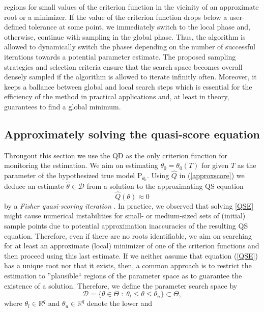 \documentclass[article, nojss]{jss}
\numberwithin{equation}{section}			%
\newcommand{\D}{\mathcal{D}}
\newcommand{\Rq}{\mathbb{R}^{q}}
\begin{document}
regions for small values of the criterion function in the vicinity of an
approximate root or a minimizer. If the value of the criterion function drops below a user-defined tolerance
at some point, we immediately switch to the local phase and, otherwise, continue
with sampling in the global phase. Thus, the algorithm is allowed to dynamically switch the phases depending
on the number of successful iterations towards a potential parameter estimate.
The proposed sampling strategies and selection criteria ensure that the search space becomes overall densely
sampled if the algorithm is allowed to iterate infinitly often. Moreover, it
keeps a ballance between global and local search steps which is essential for the efficiency of the method
in practical applications and, at least in theory, guarantees to find a global
minimum.
%
\subsection{Approximately solving the quasi-score equation}
\label{subsec:qsSolve}
Througout this section we use the QD as the only criterion function for
monitoring the estimation. We aim on estimating $\theta_0=\theta_0(T)$ for 
given $T$ as the parameter of the hypothesized true model $\mathrm{P}_{\theta_0}$.
Using $\hat{Q}$ in (\ref{approxscore}) we deduce an estimate $\hat{\theta}\in\D$
from a solution to the approximating QS equation
\begin{equation}\label{QSE}
  \hat{Q}(\theta)\approx 0
\end{equation}
by a \emph{Fisher quasi-scoring iteration} \citep[see,
e.\,g.][]{ref:Osborne1992}. In practice, we observed that solving \eqref{QSE}
might cause numerical instabilities for small- or medium-sized sets of (initial) sample
points due to potential approximation inaccuracies of the resulting QS equation.
Therefore, even if there are no roots identifiable, we aim on searching for
at least an approximate (local) minimizer of one of the criterion functions and
then proceed using this last estimate. If we neither assume that equation
(\ref{QSE}) has a unique root nor that it exists, then, a common approach is to restrict
the estimation to ''plausible`` regions of the parameter space as to guarantee
the existence of a solution. Therefore, we define the parameter search space by
\begin{equation} 
  \mathcal{D}=\{\theta\in\Theta\;:\; \theta_l\leq\theta\leq\theta_u\}\subset\Theta,
\end{equation} 
where $\theta_l\in\Rq$ and $\theta_u\in\Rq$ denote the lower and
\end{document}
